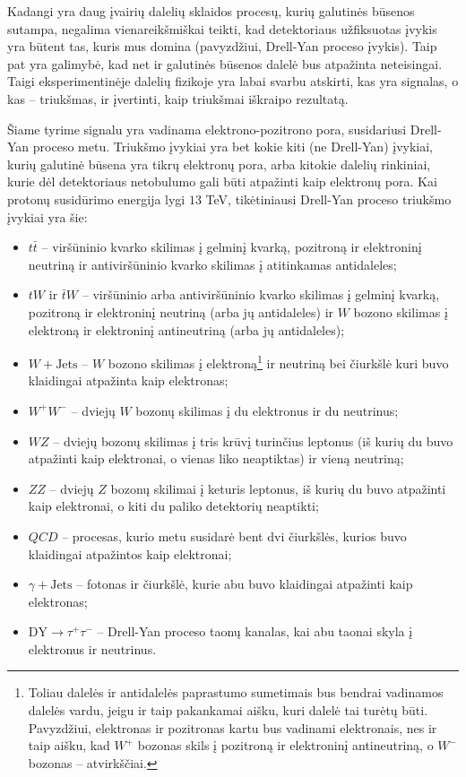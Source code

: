 \documentclass[a4paper, 12pt]{article}
\newcommand{\ZZ}{Z\! Z}
\newcommand{\WZ}{W\! Z}
\newcommand{\gJets}{\gamma\! +\!\mathrm{Jets}}
\newcommand{\WJets}{W\! +\!\mathrm{Jets}}
\newcommand{\QCD}{QC\! D}
\begin{document}
Kadangi yra daug įvairių dalelių sklaidos procesų, kurių galutinės būsenos sutampa, negalima vienareikšmiškai teikti, kad detektoriaus užfiksuotas įvykis yra būtent tas, kuris mus domina (pavyzdžiui, Drell-Yan proceso įvykis). Taip pat yra galimybė, kad net ir galutinės būsenos dalelė bus atpažinta neteisingai. Taigi eksperimentinėje dalelių fizikoje yra labai svarbu atskirti, kas yra signalas, o kas -- triukšmas, ir įvertinti, kaip triukšmai iškraipo rezultatą.

Šiame tyrime signalu yra vadinama elektrono-pozitrono pora, susidariusi Drell-Yan proceso metu. Triukšmo įvykiai yra bet kokie kiti (ne Drell-Yan) įvykiai, kurių galutinė būsena yra tikrų elektronų pora, arba kitokie dalelių rinkiniai, kurie dėl detektoriaus netobulumo gali būti atpažinti kaip elektronų pora. Kai protonų susidūrimo energija lygi $13$ TeV, tikėtiniausi Drell-Yan proceso triukšmo įvykiai yra šie:
\begin{itemize}
\item $t\bar{t}$ -- viršūninio kvarko skilimas į gelminį kvarką, pozitroną ir elektroninį neutriną ir antiviršūninio kvarko skilimas į atitinkamas antidaleles;
\item $tW$ ir $\bar{t}W$ -- viršūninio arba antiviršūninio kvarko skilimas į gelminį kvarką, pozitroną ir elektroninį neutriną (arba jų antidaleles) ir $W$ bozono skilimas į elektroną ir elektroninį antineutriną (arba jų antidaleles);
\item $\WJets$ -- $W$ bozono skilimas į elektroną\footnote{Toliau dalelės ir antidalelės paprastumo sumetimais bus bendrai vadinamos dalelės vardu, jeigu ir taip pakankamai aišku, kuri dalelė tai turėtų būti. Pavyzdžiui, elektronas ir pozitronas kartu bus vadinami elektronais, nes ir taip aišku, kad $W^{+}$ bozonas skils į pozitroną ir elektroninį antineutriną, o $W^{-}$ bozonas -- atvirkščiai.} ir neutriną bei čiurkšlė kuri buvo klaidingai atpažinta kaip elektronas;
\item $W^{+}W^{-}$ -- dviejų $W$ bozonų skilimas į du elektronus ir du neutrinus;
\item $\WZ$ -- dviejų bozonų skilimas į tris krūvį turinčius leptonus (iš kurių du buvo atpažinti kaip elektronai, o vienas liko neaptiktas) ir vieną neutriną;
\item $\ZZ$ -- dviejų $Z$ bozonų skilimai į keturis leptonus, iš kurių du buvo atpažinti kaip elektronai, o kiti du paliko detektorių neaptikti;
\item $\QCD$ -- procesas, kurio metu susidarė bent dvi čiurkšlės, kurios buvo klaidingai atpažintos kaip elektronai;
\item $\gJets$ -- fotonas ir čiurkšlė, kurie abu buvo klaidingai atpažinti kaip elektronas;
\item $\mathrm{DY} \! \rightarrow \! \tau^{+}\tau^{-}$ -- Drell-Yan proceso taonų kanalas, kai abu taonai skyla į elektronus ir neutrinus.
\end{itemize}
\end{document}
